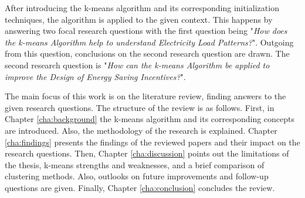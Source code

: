 After introducing the k-means algorithm and its corresponding initialization techniques, the algorithm is applied to the given context.
This happens by answering two focal research questions with the first question being "\textit{How does the k-means Algorithm help to understand Electricity Load Patterns?}".
Outgoing from this question, conclusions on the second research question are drawn.
The second research question is "\textit{How can the k-means Algorithm be applied to improve the Design of Energy Saving Incentives?}".

The main focus of this work is on the literature review, finding answers to the given research questions.
The structure of the review is as follows.
First, in Chapter \ref{cha:background} the k-means algorithm and its corresponding concepts are introduced.
Also, the methodology of the research is explained.
Chapter \ref{cha:findings} presents the findings of the reviewed papers and their impact on the research questions.
Then, Chapter \ref{cha:discussion} points out the limitations of the thesis, k-means strengths and weaknesses, and a brief comparison of clustering methods.
Also, outlooks on future improvements and follow-up questions are given.
Finally, Chapter \ref{cha:conclusion} concludes the review.